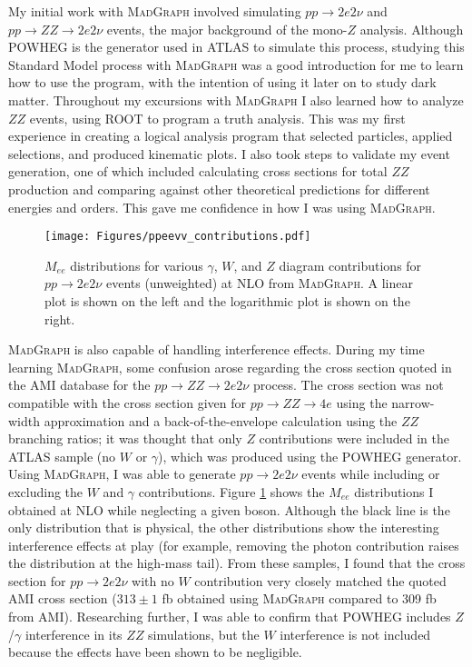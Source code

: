 My initial work with \textsc{MadGraph} involved simulating $pp \rightarrow 2e2\nu$ and $pp \rightarrow ZZ \rightarrow 2e2\nu$ events, the major background of the mono-$Z$ analysis. Although POWHEG is the generator used in ATLAS to simulate this process, studying this Standard Model process with \textsc{MadGraph} was a good introduction for me to learn how to use the program, with the intention of using it later on to study dark matter. Throughout my excursions with \textsc{MadGraph} I also learned how to analyze $ZZ$ events, using ROOT to program a truth analysis. This was my first experience in creating a logical analysis program that selected particles, applied selections, and produced kinematic plots. I also took steps to validate my event generation, one of which included calculating cross sections for total $ZZ$ production and comparing against other theoretical predictions for different energies and orders. This gave me confidence in how I was using \textsc{MadGraph}.

\begin{figure}[hb]
\centering
\texttt{[image: Figures/ppeevv\_contributions.pdf]}
\caption[$M_{ee}$ distributions for various $\gamma$, $W$, and $Z$ diagram contributions for $pp \rightarrow 2e2\nu$ events (unweighted) at NLO from \textsc{MadGraph}]{$M_{ee}$ distributions for various $\gamma$, $W$, and $Z$ diagram contributions for $pp \rightarrow 2e2\nu$ events (unweighted) at NLO from \textsc{MadGraph}. A linear plot is shown on the left and the logarithmic plot is shown on the right.}
\label{fig:ppeevv_contributions}
\end{figure}

\textsc{MadGraph} is also capable of handling interference effects. During my time learning \textsc{MadGraph}, some confusion arose regarding the cross section quoted in the AMI database for the $pp \rightarrow ZZ \rightarrow 2e2\nu$ process. The cross section was not compatible with the cross section given for $pp \rightarrow ZZ \rightarrow 4e$ using the narrow-width approximation and a back-of-the-envelope calculation using the $ZZ$ branching ratios; it was thought that only $Z$ contributions were included in the ATLAS sample (no $W$ or $\gamma$), which was produced using the POWHEG generator. Using \textsc{MadGraph}, I was able to generate $pp \rightarrow 2e2\nu$ events while including or excluding the $W$ and $\gamma$ contributions. Figure \ref{fig:ppeevv_contributions} shows the $M_{ee}$ distributions I obtained at NLO while neglecting a given boson. Although the black line is the only distribution that is physical, the other distributions show the interesting interference effects at play (for example, removing the photon contribution raises the distribution at the high-mass tail). From these samples, I found that the cross section for $pp \rightarrow 2e2\nu$ with no $W$ contribution very closely matched the quoted AMI cross section ($313 \pm 1$ fb obtained using \textsc{MadGraph} compared to 309 fb from AMI). Researching further, I was able to confirm that POWHEG includes $Z$/$\gamma$ interference in its $ZZ$ simulations, but the $W$ interference is not included because the effects have been shown to be negligible. 